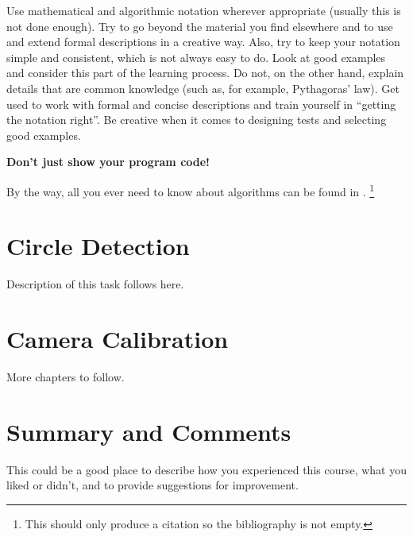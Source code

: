 \documentclass[a4paper,english,11pt]{report}
\begin{document}
Use mathematical and algorithmic notation wherever appropriate (usually this is not done enough). Try to go beyond the material you find elsewhere and to use and extend formal descriptions in a creative way. Also, try to keep your notation simple and consistent, which is not always easy to do. Look at good examples and consider this part of the learning process. Do not, on the other hand, explain details that are common knowledge (such as, for example, Pythagoras' law). Get used to work with formal and concise descriptions and train yourself in ``getting the notation right''.
Be creative when it comes to designing tests and selecting good examples.
%
\begin{center}
\textbf{Don't just show your program code!} 
\end{center}
%
By the way, all you ever need to know about algorithms can be 
found in \cite{Sedgewick2011}.%
\footnote{This should only produce a citation so the bibliography is not empty.} 


\chapter{Circle Detection}

Description of this task follows here.



\chapter{Camera Calibration}

More chapters to follow.



\chapter{Summary and Comments}

This could be a good place to describe how you experienced this course, what you liked or didn't, and to provide suggestions for improvement.


\MakeBibliography[nosplit]
\end{document}
